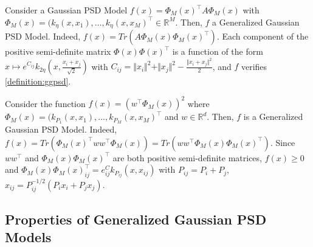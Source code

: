 \begin{example}
Consider a Gaussian PSD Model $f(x) = \Phi_M(x)^\top  A \Phi_M(x)$ with $\Phi_M(x) = (k_\eta(x, x_1), \ldots, k_\eta(x, x_M)^\top\in\mathbb R^M$. Then, $f$ a Generalized Gaussian PSD Model. Indeed,
$f(x) = Tr(A \Phi_M(x) \Phi_M(x)^\top )$.
Each component of the positive semi-definite matrix $\Phi(x)\Phi(x)^\top $ is a function of the form $x \mapsto e^{C_{ij}}k_{2\eta}(x, \frac{x_i + x_j}{\sqrt{2}})$ with $C_{ij}=\Vert x_i\Vert^2 + \Vert x_j \Vert^2 -\frac{\Vert x_i + x_j\Vert^2}{2}$, and $f$ verifies \cref{definition:ggpsd}.
\end{example}
\begin{example}
Consider the function $f(x) = \left( w^\top \Phi_M(x)\right)^2$ where $\Phi_M(x) = (k_{P_1}(x, x_1), \ldots, k_{P_M}(x, x_M)^\top $ and $w\in\mathbb R^d$. Then, $f$ is a Generalized Gaussian PSD Model. Indeed, $f(x) = Tr\left(\Phi_M(x)^\top ww^\top \Phi_M(x)\right)=Tr\left(ww^\top  \Phi_M(x)\Phi_M(x)^\top \right)$. Since $ww^\top $ and $\Phi_M(x)\Phi_M(x)^\top $ are both positive semi-definite matrices, $f(x)\geq 0$ and $\Phi_M(x)\Phi_M(x)^\top _{ij}=e^C_{ij}k_{P_{ij}}(x, x_{ij})$ with $P_{ij} = P_i + P_j$, $x_{ij} = P_{ij}^{-1/2}\left(P_ix_i + P_jx_j\right)$.
\end{example}

\subsection{Properties of Generalized Gaussian PSD Models}

